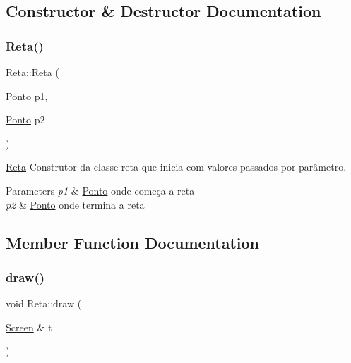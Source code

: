 \subsection{Constructor \& Destructor Documentation}
\mbox{\label{class_reta_a79c6845d930a7762d80224e5857fe3da}} 
\subsubsection{\texorpdfstring{Reta()}{Reta()}}
{\footnotesize\ttfamily Reta\+::\+Reta (\begin{DoxyParamCaption}\item[{\mbox{\hyperlink{class_ponto}{Ponto}}}]{p1,  }\item[{\mbox{\hyperlink{class_ponto}{Ponto}}}]{p2 }\end{DoxyParamCaption})}



\mbox{\hyperlink{class_reta}{Reta}} Construtor da classe reta que inicia com valores passados por parâmetro. 


\begin{DoxyParams}{Parameters}
{\em p1} & \mbox{\hyperlink{class_ponto}{Ponto}} onde começa a reta \\
\hline
{\em p2} & \mbox{\hyperlink{class_ponto}{Ponto}} onde termina a reta \\
\hline
\end{DoxyParams}


\subsection{Member Function Documentation}
\mbox{\label{class_reta_ac2e9805183cd474b62bffd8b032cd780}} 
\subsubsection{\texorpdfstring{draw()}{draw()}}
{\footnotesize\ttfamily void Reta\+::draw (\begin{DoxyParamCaption}\item[{\mbox{\hyperlink{class_screen}{Screen}} \&}]{t }\end{DoxyParamCaption})\hspace{0.3cm}{\ttfamily [virtual]}}



